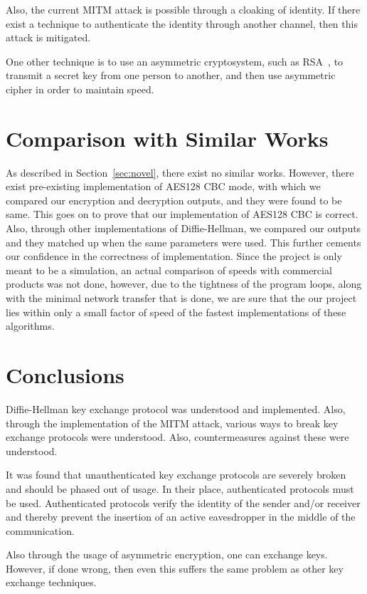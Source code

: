 \documentclass[12pt,a4paper]{article}
\begin{document}
Also, the current MITM attack is possible through a cloaking of identity. If there exist a technique to authenticate the identity through another channel, then this attack is mitigated.

One other technique is to use an asymmetric cryptosystem, such as RSA~\cite{rsa}, to transmit a secret key from one person to another, and then use asymmetric cipher in order to maintain speed. 

\section{Comparison with Similar Works}
\label{sec:similar}

As described in Section~\ref{sec:novel}, there exist no similar works. However, there exist pre-existing implementation of AES128 CBC mode, with which we compared our encryption and decryption outputs, and they were found to be same. This goes on to prove that our implementation of AES128 CBC is correct. Also, through other implementations of Diffie-Hellman, we compared our outputs and they matched up when the same parameters were used. This further cements our confidence in the correctness of implementation. Since the project is only meant to be a simulation, an actual comparison of speeds with commercial products was not done, however, due to the tightness of the program loops, along with the minimal network transfer that is done, we are sure that the our project lies within only a small factor of speed of the fastest implementations of these algorithms.

\section{Conclusions}
\label{sec:conclusion}

Diffie-Hellman key exchange protocol was understood and implemented. Also, through the implementation of the MITM attack, various ways to break key exchange protocols were understood. Also, countermeasures against these were understood.

It was found that unauthenticated key exchange protocols are severely broken and should be phased out of usage. In their place, authenticated protocols must be used. Authenticated protocols verify the identity of the sender and/or receiver and thereby prevent the insertion of an active eavesdropper in the middle of the communication.

Also through the usage of asymmetric encryption, one can exchange keys. However, if done wrong, then even this suffers the same problem as other key exchange techniques.
\end{document}
